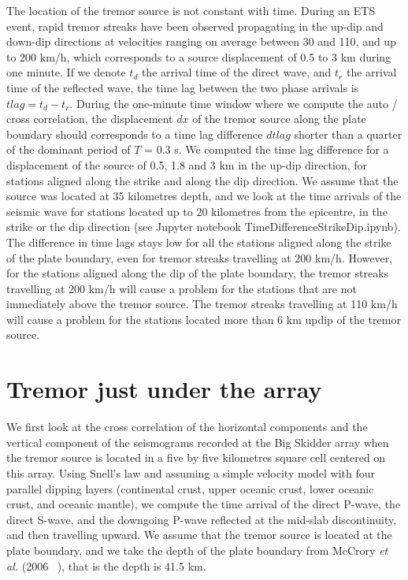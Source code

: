 \documentclass[workdone.tex]{subfiles}
\begin{document}
The location of the tremor source is not constant with time. During an ETS event, rapid tremor streaks have been observed propagating in the up-dip and down-dip directions at velocities ranging on average between 30 and 110, and up to 200 km/h, which corresponds to a source displacement of 0.5 to 3 km during one minute. If we denote $t_d$ the arrival time of the direct wave, and $t_r$ the arrival time of the reflected wave, the time lag between the two phase arrivals is $tlag = t_d - t_r$. During the one-minute time window where we compute the auto / cross correlation, the displacement $dx$ of the tremor source along the plate boundary should corresponds to a time lag difference $dtlag$ shorter than a quarter of the dominant period of $T$ = 0.3 s. We computed the time lag difference for a displacement of the source of 0.5, 1.8 and 3 km in the up-dip direction, for stations aligned along the strike and along the dip direction. We assume that the source was located at 35 kilometres depth, and we look at the time arrivals of the seismic wave for stations located up to 20 kilometres from the epicentre, in the strike or the dip direction (see Jupyter notebook TimeDifferenceStrikeDip.ipynb). The difference in time lags stays low for all the stations aligned along the strike of the plate boundary, even for tremor streaks travelling at 200 km/h. However, for the stations aligned along the dip of the plate boundary, the tremor streaks travelling at 200 km/h will cause a problem for the stations that are not immediately above the tremor source. The tremor streaks travelling at 110 km/h will cause a problem for the stations located more than 6 km updip of the tremor source.

\section{Tremor just under the array}

We first look at the cross correlation of the horizontal components and the vertical component of the seismograms recorded at the Big Skidder array when the tremor source is located in a five by five kilometres square cell centered on this array. Using Snell's law and assuming a simple velocity model with four parallel dipping layers (continental crust, upper oceanic crust, lower oceanic crust, and oceanic mantle), we compute the time arrival of the direct P-wave, the direct S-wave, and the downgoing P-wave reflected at the mid-slab discontinuity, and then travelling upward. We assume that the tremor source is located at the plate boundary, and we take the depth of the plate boundary from McCrory \textit{et al.} (2006 ~\cite{MCC_2006}), that is the depth is 41.5 km. \\
\end{document}
